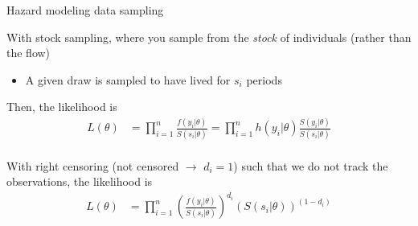 \documentclass[notes,11pt, aspectratio=169]{beamer}
\newenvironment{wideitemize}{\itemize\addtolength{\itemsep}{10pt}}{\enditemize}
\begin{document}
\begin{frame}{Hazard modeling data sampling}
  \begin{wideitemize}
    \item With stock sampling, where you sample from the \emph{stock} of individuals (rather than the flow)
      \begin{itemize}
      \item A given draw is sampled to have lived for $s_{i}$ periods
      \end{itemize}
    \item Then,  the likelihood is
      \begin{align*}
        L(\theta) &= \prod_{i=1}^{n} \frac{f(y_{i}|\theta)}{S(s_{i}|\theta)} = \prod_{i=1}^{n} h(y_{i}|\theta) \frac{S(y_{i}|\theta)}{S(s_{i}|\theta)}\\
      \end{align*}
    \item With right censoring (not censored $\rightarrow$ $d_{i} = 1$) such that we do not track the observations, the likelihood is
      \begin{align*}
        L(\theta) &= \prod_{i=1}^{n} \left(\frac{f(y_{i}|\theta)}{S(s_{i}|\theta)}\right)^{d_{i}}\left(S(s_{i}|\theta)\right)^{(1-d_{i})}
      \end{align*}
  \end{wideitemize}
\end{frame}
\end{document}
